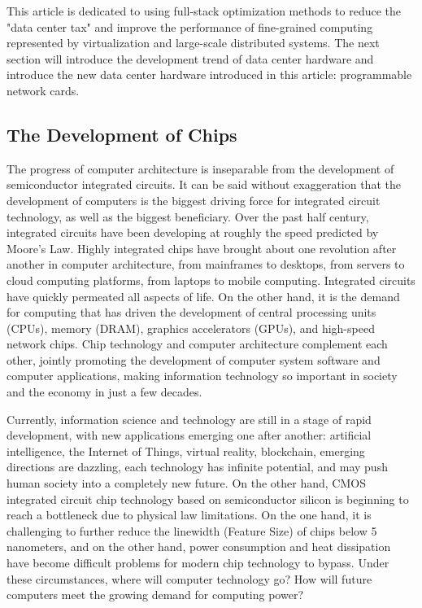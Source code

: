 This article is dedicated to using full-stack optimization methods to reduce the "data center tax" and improve the performance of fine-grained computing represented by virtualization and large-scale distributed systems. The next section will introduce the development trend of data center hardware and introduce the new data center hardware introduced in this article: programmable network cards.
\fi

\iffalse

\subsection{The Development of Chips}

The progress of computer architecture is inseparable from the development of semiconductor integrated circuits. It can be said without exaggeration that the development of computers is the biggest driving force for integrated circuit technology, as well as the biggest beneficiary. Over the past half century, integrated circuits have been developing at roughly the speed predicted by Moore's Law. Highly integrated chips have brought about one revolution after another in computer architecture, from mainframes to desktops, from servers to cloud computing platforms, from laptops to mobile computing. Integrated circuits have quickly permeated all aspects of life. On the other hand, it is the demand for computing that has driven the development of central processing units (CPUs), memory (DRAM), graphics accelerators (GPUs), and high-speed network chips. Chip technology and computer architecture complement each other, jointly promoting the development of computer system software and computer applications, making information technology so important in society and the economy in just a few decades.

Currently, information science and technology are still in a stage of rapid development, with new applications emerging one after another: artificial intelligence, the Internet of Things, virtual reality, blockchain, emerging directions are dazzling, each technology has infinite potential, and may push human society into a completely new future. On the other hand, CMOS integrated circuit chip technology based on semiconductor silicon is beginning to reach a bottleneck due to physical law limitations. On the one hand, it is challenging to further reduce the linewidth (Feature Size) of chips below 5 nanometers, and on the other hand, power consumption and heat dissipation have become difficult problems for modern chip technology to bypass. Under these circumstances, where will computer technology go? How will future computers meet the growing demand for computing power?

